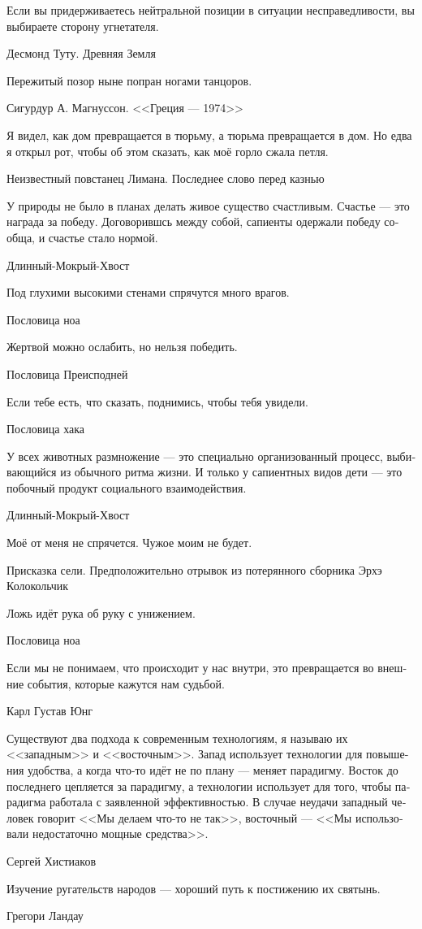 \documentclass[a4paper,12pt,fleqn]{book}\usepackage{polyglossia}\setdefaultlanguage[babelshorthands=true]{russian}\setotherlanguage{english}\defaultfontfeatures{Ligatures=TeX,Mapping=tex-text}\usepackage{xcolor}\newcommand{\ml}[3]{#2}
\begin{document}
{\epigraph
{Если вы придерживаетесь нейтральной позиции в ситуации несправедливости, вы выбираете сторону угнетателя.}
{Десмонд Туту. Древняя Земля}

\epigraph
{Пережитый позор ныне попран ногами танцоров.}
{Сигурдур А. Магнуссон. <<Греция --- 1974>>}

\epigraph
{Я видел, как дом превращается в тюрьму, а тюрьма превращается в дом.
Но едва я открыл рот, чтобы об этом сказать, как моё горло сжала петля.}
{Неизвестный повстанец Лимана.
Последнее слово перед казнью}

\epigraph{У природы не было в планах делать живое существо счастливым.
Счастье --- это награда за победу.
Договорившсь между собой, сапиенты одержали победу сообща, и счастье стало нормой.}
{Длинный-Мокрый-Хвост}

\epigraph{Под глухими высокими стенами спрячутся много врагов.}
{Пословица ноа}

\epigraph
{Жертвой можно ослабить, но нельзя победить.}
{Пословица Преисподней}

\epigraph
{Если тебе есть, что сказать, поднимись, чтобы тебя увидели.}
{Пословица хака}

\epigraph
{У всех животных размножение --- это специально организованный процесс, выбивающийся из обычного ритма жизни.
И только у сапиентных видов дети --- это побочный продукт социального взаимодействия.}
{Длинный-Мокрый-Хвост}

\epigraph
{Моё от меня не спрячется.
Чужое моим не будет.}
{Присказка сели.
Предположительно отрывок из потерянного сборника Эрхэ Колокольчик}

\epigraph
{Ложь идёт рука об руку с унижением.}
{Пословица ноа}

\epigraph
{Если мы не понимаем, что происходит у нас внутри, это превращается во внешние события, которые кажутся нам судьбой.}
{Карл Густав Юнг}

\epigraph
{Существуют два подхода к современным технологиям, я называю их <<западным>> и <<восточным>>.
Запад использует технологии для повышения удобства, а когда что-то идёт не по плану --- меняет парадигму.
Восток до последнего цепляется за парадигму, а технологии использует для того, чтобы парадигма работала с заявленной эффективностью.
В случае неудачи западный человек говорит <<Мы делаем что-то не так>>, восточный --- <<Мы использовали недостаточно мощные средства>>.}
{Сергей Хистиаков}

\epigraph{Изучение ругательств народов --- хороший путь к постижению их святынь.}
{Грегори Ландау}

}
\end{document}
